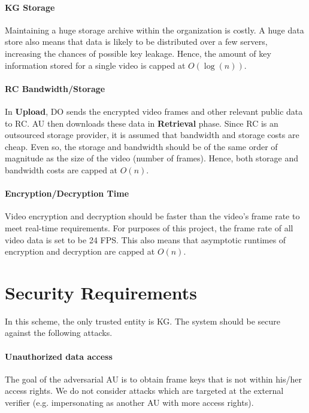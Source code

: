 \documentclass[hyp,a4paper,12pt,openbib]{socreport}
\begin{document}
\paragraph{KG Storage} Maintaining a huge storage archive within the organization is costly. A huge data store also means that data is likely to be distributed over a few servers, increasing the chances of possible key leakage. Hence, the amount of key information stored for a single video is capped at $O(\log(n))$.

\paragraph{RC Bandwidth/Storage} In \textbf{Upload}, DO sends the encrypted video frames and other relevant public data to RC. AU then downloads these data in \textbf{Retrieval} phase. Since RC is an outsourced storage provider, it is assumed that bandwidth and storage costs are cheap. Even so, the storage and bandwidth should be of the same order of magnitude as the size of the video (number of frames). Hence, both storage and bandwidth costs are capped at $O(n)$.

\paragraph{Encryption/Decryption Time} Video encryption and decryption should be faster than the video's frame rate to meet real-time requirements. For purposes of this project, the frame rate of all video data is set to be 24 FPS. This also means that asymptotic runtimes of encryption and decryption are capped at $O(n)$.




\section{Security Requirements}
In this scheme, the only trusted entity is KG. The system should be secure against the following attacks.


\paragraph{Unauthorized data access}The goal of the adversarial AU is to obtain frame keys that is not within his/her access rights.  We do not consider attacks which are targeted at the external verifier (e.g. impersonating as another AU with more access rights).
\end{document}
